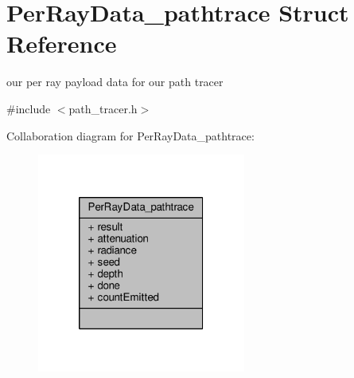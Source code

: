 \hypertarget{struct_per_ray_data__pathtrace}{\section{Per\-Ray\-Data\-\_\-pathtrace Struct Reference}
\label{struct_per_ray_data__pathtrace}
}


our per ray payload data for our path tracer  




{\ttfamily \#include $<$path\-\_\-tracer.\-h$>$}



Collaboration diagram for Per\-Ray\-Data\-\_\-pathtrace\-:
\nopagebreak
\begin{figure}[H]
\begin{center}
\leavevmode
\includegraphics[width=194pt]{struct_per_ray_data__pathtrace__coll__graph}
\end{center}
\end{figure}
